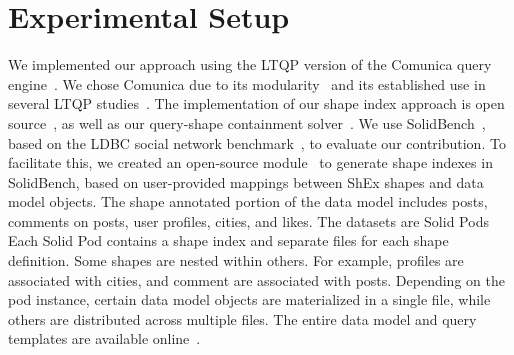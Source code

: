 \section{Experimental Setup}






We implemented our approach using the LTQP version of the Comunica query engine~\cite{taelman_iswc_resources_comunica_2018}.
We chose Comunica due to its modularity~\cite{taelman_swj_componentsjs_2022} and its established use in several LTQP studies~\cite{Bogaerts2021LinkTW, Taelman2023, eschauzier_quweda_linkqueue_2023, Hanski2024, eschauzier_amw_rcubemetric_2024, tam2024opportunitiesshapebasedoptimizationlink}.
The implementation of our shape index approach is open source~, as well as our query-shape containment solver~.
We use SolidBench~\cite{Taelman2023}, based on the LDBC social network benchmark~\cite{Angles2020}, to evaluate our contribution. 
To facilitate this, we created an open-source module~ to generate shape indexes in SolidBench, based on user-provided mappings between ShEx shapes and data model objects.
The shape annotated portion of the data model includes posts, comments on posts, user profiles, cities, and likes.
The datasets are Solid Pods~\cite{Taelman2023}
Each Solid Pod contains a shape index and separate files for each shape definition.
Some shapes are nested within others. 
For example, profiles are associated with cities, and comment are associated with posts.
Depending on the pod instance, certain data model objects are materialized in a single file, while others are distributed across multiple files.
The entire data model and query templates are available online~.

